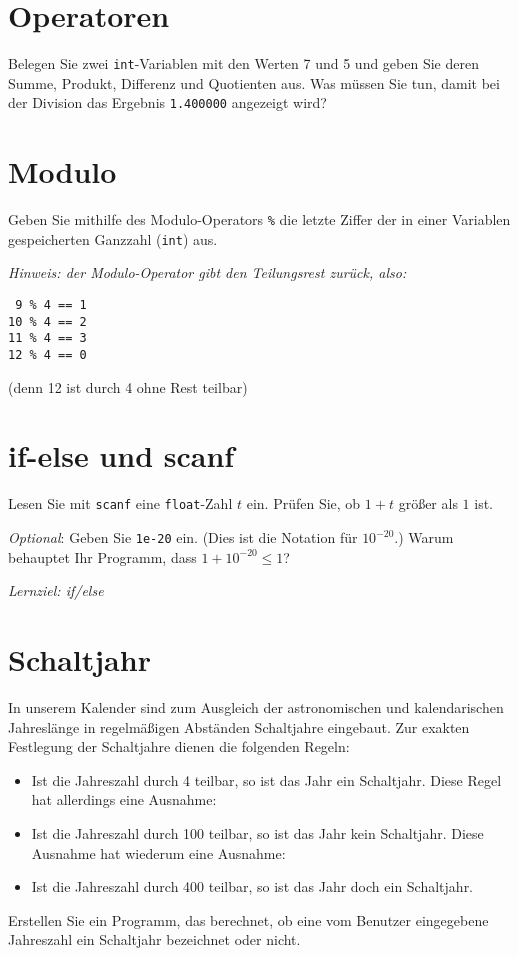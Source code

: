 \documentclass[
	ngerman,
	fontsize=10pt,
	parskip=half,
	titlepage=true,
	DIV=12
]{scrartcl}
\newcommand*{\inC}[1]{\texttt{#1}}
\begin{document}
\section{Operatoren}
Belegen Sie zwei \inC{int}-Variablen mit den Werten 7 und 5 und geben Sie deren Summe, Produkt, Differenz und Quotienten aus. Was müssen Sie tun, damit bei der Division das Ergebnis \texttt{1.400000} angezeigt wird?


\section{Modulo}
Geben Sie mithilfe des Modulo-Operators \texttt{\%} die letzte Ziffer der in einer Variablen gespeicherten Ganzzahl (\inC{int}) aus.

\emph{Hinweis: der Modulo-Operator gibt den Teilungsrest  zurück, also:}
\begin{center}
\texttt{ 9 \% 4 == 1}\\
\texttt{10 \% 4 == 2}\\
\texttt{11 \% 4 == 3}\\
\texttt{12 \% 4 == 0}
\end{center}
(denn 12 ist durch 4 ohne Rest teilbar)

\section{if-else und scanf}
Lesen Sie mit \texttt{scanf} eine \texttt{float}-Zahl $t$ ein. Prüfen Sie, ob \mbox{$1 + t$} größer als $1$ ist. 

\emph{Optional}: Geben Sie \texttt{1e-20} ein. (Dies ist die Notation für $10^{-20}$.) Warum behauptet Ihr Programm, dass $1 + 10^{-20} \leq 1$?

\emph{Lernziel: if/else}


\section{Schaltjahr}
In unserem Kalender sind zum Ausgleich der astronomischen und kalendarischen
Jahreslänge in regelmäßigen Abständen Schaltjahre eingebaut.
Zur exakten Festlegung der Schaltjahre dienen die folgenden Regeln:

\begin{itemize}
  \item Ist die Jahreszahl durch 4 teilbar,
  so ist das Jahr ein Schaltjahr. Diese Regel hat allerdings eine Ausnahme: 
  \item Ist die Jahreszahl durch 100 teilbar,
  so ist das Jahr kein Schaltjahr. Diese Ausnahme hat 
  wiederum eine Ausnahme: 
  \item Ist die Jahreszahl durch 400 teilbar, so ist das Jahr doch ein Schaltjahr. 
\end{itemize}
Erstellen Sie ein Programm, das berechnet, ob eine vom Benutzer eingegebene Jahreszahl ein 
Schaltjahr bezeichnet oder nicht.
\end{document}
